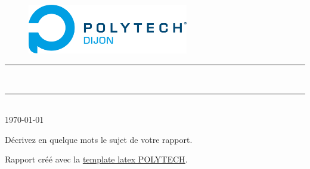 \thispagestyle{empty} %
\setcounter{page}{0} %

\begin{figure}[H]
\centering
\includegraphics[width=7cm]{./Graphismes-POLYTECH/logos/logo-couleur.png}
\end{figure}

\vspace{3cm}

\begin{center}

{\color{bleufPOLYTECH}\rule{\linewidth}{0.8mm}}
\vspace*{0mm}

\Huge{\textbf{\theUV \\ \thetitle}}
{\color{bleufPOLYTECH}\rule{\linewidth}{0.8mm}}

\vspace{0.5cm}
\Large{\theauthor} \\
\vspace{0.5cm}
\Large{\today}
\end{center}
 
\vspace{3cm}

\begin{myabstract}
Décrivez en quelque mots le sujet de votre rapport. \\
\end{myabstract}

\begin{credits}
Rapport créé avec la \underline{\href{https://github.com/polytech-dijon/template-latex-POLYTECH}{template latex POLYTECH}}.
\end{credits}

\clearpage